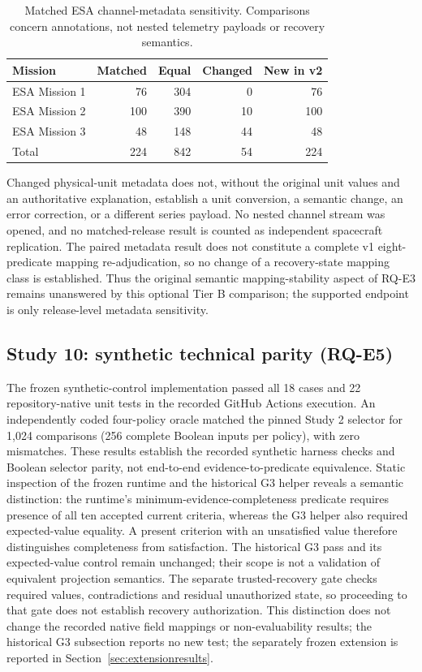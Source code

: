 \documentclass[preprint,12pt]{elsarticle}
\begin{document}
\begin{table}[htbp]
\centering
\caption{Matched ESA channel-metadata sensitivity. Comparisons concern annotations, not nested telemetry payloads or recovery semantics.}
\label{tab:esareleases}
\begin{tabular}{lrrrr}
\toprule
Mission & Matched & Equal & Changed & New in v2 \\
\midrule
ESA Mission 1 & 76 & 304 & 0 & 76 \\
ESA Mission 2 & 100 & 390 & 10 & 100 \\
ESA Mission 3 & 48 & 148 & 44 & 48 \\
\midrule
Total & 224 & 842 & 54 & 224 \\
\bottomrule
\end{tabular}
\end{table}

Changed physical-unit metadata does not, without the original unit values and an authoritative explanation, establish a unit conversion, a semantic change, an error correction, or a different series payload. No nested channel stream was opened, and no matched-release result is counted as independent spacecraft replication. The paired metadata result does not constitute a complete v1 eight-predicate mapping re-adjudication, so no change of a recovery-state mapping class is established. Thus the original semantic mapping-stability aspect of RQ-E3 remains unanswered by this optional Tier B comparison; the supported endpoint is only release-level metadata sensitivity.

\subsection{Study 10: synthetic technical parity (RQ-E5)}
The frozen synthetic-control implementation passed all 18 cases and 22 repository-native unit tests in the recorded GitHub Actions execution. An independently coded four-policy oracle matched the pinned Study 2 selector for 1,024 comparisons (256 complete Boolean inputs per policy), with zero mismatches. These results establish the recorded synthetic harness checks and Boolean selector parity, not end-to-end evidence-to-predicate equivalence. Static inspection of the frozen runtime and the historical G3 helper reveals a semantic distinction: the runtime's minimum-evidence-completeness predicate requires presence of all ten accepted current criteria, whereas the G3 helper also required expected-value equality. A present criterion with an unsatisfied value therefore distinguishes completeness from satisfaction. The historical G3 pass and its expected-value control remain unchanged; their scope is not a validation of equivalent projection semantics. The separate trusted-recovery gate checks required values, contradictions and residual unauthorized state, so proceeding to that gate does not establish recovery authorization. This distinction does not change the recorded native field mappings or non-evaluability results; the historical G3 subsection reports no new test; the separately frozen extension is reported in Section~\ref{sec:extensionresults}.
\end{document}
